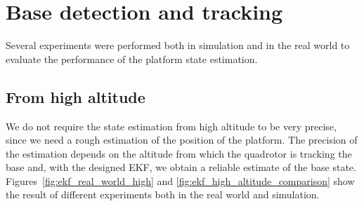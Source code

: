 \section{Base detection and tracking}
Several experiments were performed both in simulation and in the real world to evaluate the performance of the platform state estimation.

\subsection{From high altitude}
We do not require the state estimation from high altitude to be very precise, since we need a rough estimation of the position of the platform.
The precision of the estimation depends on the altitude from which the quadrotor is tracking the base and, with the designed EKF, we obtain a reliable estimate of the base state.\\
Figures~\ref{fig:ekf_real_world_high} and \ref{fig:ekf_high_altitude_comparison} show the result of different experiments both in the real world and simulation.\\


